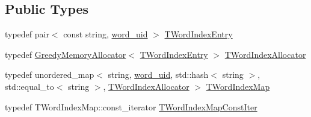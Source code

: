 \subsection*{Public Types}
\begin{DoxyCompactItemize}
\item 
typedef pair$<$ const string, \hyperlink{namespaceuva_1_1smt_1_1bpbd_1_1server_a6bfe45ba344d65a7fdd7d26156328ddc}{word\+\_\+uid} $>$ \hyperlink{classuva_1_1smt_1_1bpbd_1_1server_1_1lm_1_1dictionary_1_1basic__word__index_a61bd773bb1c79c5be7679fc557f27747}{T\+Word\+Index\+Entry}
\item 
typedef \hyperlink{classuva_1_1utils_1_1containers_1_1alloc_1_1_greedy_memory_allocator}{Greedy\+Memory\+Allocator}$<$ \hyperlink{classuva_1_1smt_1_1bpbd_1_1server_1_1lm_1_1dictionary_1_1basic__word__index_a61bd773bb1c79c5be7679fc557f27747}{T\+Word\+Index\+Entry} $>$ \hyperlink{classuva_1_1smt_1_1bpbd_1_1server_1_1lm_1_1dictionary_1_1basic__word__index_a056edf8ef4a61b1cfde2f2269437f6d5}{T\+Word\+Index\+Allocator}
\item 
typedef unordered\+\_\+map$<$ string, \hyperlink{namespaceuva_1_1smt_1_1bpbd_1_1server_a6bfe45ba344d65a7fdd7d26156328ddc}{word\+\_\+uid}, std\+::hash$<$ string $>$, std\+::equal\+\_\+to$<$ string $>$, \hyperlink{classuva_1_1smt_1_1bpbd_1_1server_1_1lm_1_1dictionary_1_1basic__word__index_a056edf8ef4a61b1cfde2f2269437f6d5}{T\+Word\+Index\+Allocator} $>$ \hyperlink{classuva_1_1smt_1_1bpbd_1_1server_1_1lm_1_1dictionary_1_1basic__word__index_ab58bffa80202cb71ba13ba19814b622c}{T\+Word\+Index\+Map}
\item 
typedef T\+Word\+Index\+Map\+::const\+\_\+iterator \hyperlink{classuva_1_1smt_1_1bpbd_1_1server_1_1lm_1_1dictionary_1_1basic__word__index_ac35f9263ddd75993ac68944b4521ec38}{T\+Word\+Index\+Map\+Const\+Iter}
\end{DoxyCompactItemize}

